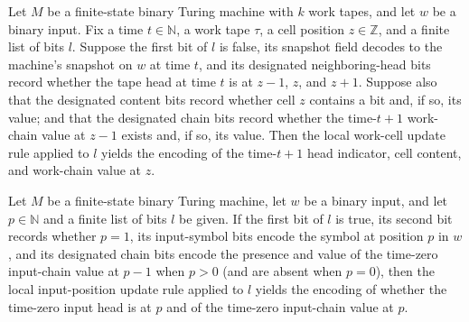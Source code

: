 \begin{theorem}
\label{Complexity.cfgF_cell_succ}
\leanok
{}
Let $M$ be a finite-state binary Turing machine with $k$ work tapes, and let $w$ be a
binary input. Fix a time $t\in\mathbb N$, a work tape $\tau$, a cell position
$z\in\mathbb Z$, and a finite list of bits $l$. Suppose the first bit of $l$ is false,
its snapshot field decodes to the machine's snapshot on $w$ at time $t$, and its
designated neighboring-head bits record whether the tape head at time $t$ is at $z-1$,
$z$, and $z+1$. Suppose also that the designated content bits record whether cell $z$
contains a bit and, if so, its value; and that the designated chain bits record whether
the time-$t+1$ work-chain value at $z-1$ exists and, if so, its value. Then the local
work-cell update rule applied to $l$ yields the encoding of the time-$t+1$ head
indicator, cell content, and work-chain value at $z$.
\end{theorem}

\begin{theorem}
\label{Complexity.cfgF_inp_zero}
\leanok
{}
Let $M$ be a finite-state binary Turing machine, let $w$ be a binary input, and let
$p\in\mathbb N$ and a finite list of bits $l$ be given. If the first bit of $l$ is true,
its second bit records whether $p=1$, its input-symbol bits encode the symbol at
position $p$ in $w$, and its designated chain bits encode the presence and value of the
time-zero input-chain value at $p-1$ when $p>0$ (and are absent when $p=0$), then the
local input-position update rule applied to $l$ yields the encoding of whether the
time-zero input head is at $p$ and of the time-zero input-chain value at $p$.
\end{theorem}

